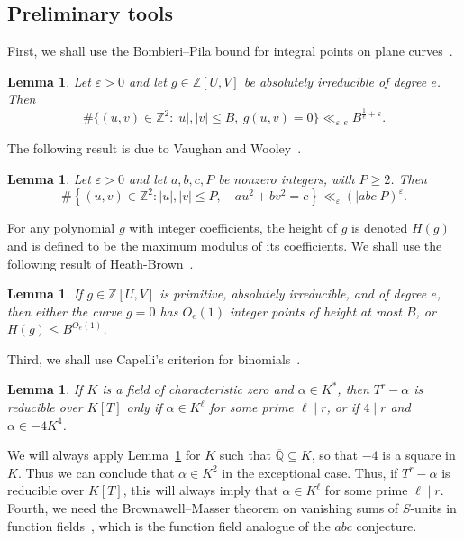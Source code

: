 \documentclass[a4paper,11pt,twoside,reqno]{amsart}
\newtheorem{lemma}[theorem]{Lemma}
\theoremstyle{definition}
\theoremstyle{remark}
\numberwithin{equation}{section}
\newcommand\eps{\varepsilon}
\newcommand\ve{\varepsilon}
\newcommand\Z{\mathbb{Z}}
\newcommand\ZZ{\mathbb{Z}}
\newcommand\K{\overline{\mathbb{Q}}}
\newcommand\1{\mathbf{1}}
\renewcommand{\leq}{\leqslant}
\renewcommand{\geq}{\geqslant}
\begin{document}
\subsection{Preliminary tools}\label{s:goat}

First, we shall use the Bombieri--Pila bound for integral points on plane curves~\cite[Theorem 5]{BombieriPila}.
\begin{lemma}\label{lem:BP}
Let $\ve>0$ and let $g\in\Z[U,V]$ be absolutely irreducible of degree $e$. Then 
\[
\#\{(u,v)\in\Z^2: |u|,|v|\leq B,\ g(u,v)=0\}\ll_{\eps,e}B^{\frac 1e+\eps}.
\] 
\end{lemma}

The following result is due to Vaughan and Wooley~\cite[Lemma~3.5]{VW}.

\begin{lemma}\label{lem:VW} 
Let $\ve>0$ and let $a,b,c,P$ be nonzero integers, with $P\geq2$. Then
 \[ \#\left\{ (u,v)\in\ZZ^2: |u|,|v|\leq P,\quad au^2+bv^2=c \right\} \ll_\varepsilon (|abc|P)^\varepsilon. \] 
 \end{lemma} 

For any polynomial $g$ with integer coefficients, the height of $g$ is 
denoted $H(g)$ and is 
defined to be the maximum modulus of its coefficients.
We shall use the following result of Heath-Brown~\cite[Theorem 5]{HeathBrown}.

\begin{lemma}\label{lem:large}
If $g\in\Z[U,V]$ is primitive, absolutely irreducible, and of degree $e$, then either the curve $g=0$ has $O_e(1)$ integer points of height at most $B$, or $H(g)\leq B^{O_e(1)}$. 
\end{lemma}

Third, we shall use Capelli's criterion for binomials~\cite[Theorem VI.9.1]{lang}. 
\begin{lemma}\label{lem:capelli}
If $K$ is a field of characteristic zero and $\alpha\in K^*$, then $T^r-\alpha$ is reducible over $K[T]$ only if $\alpha\in K^\ell$ for some prime $\ell\mid r$, or if $4\mid r$ and $\alpha\in -4K^4$.
\end{lemma}

We will always apply Lemma~\ref{lem:capelli} for $K$ such that $\K\subseteq K$, so that $-4$ is 
a square in $K$. Thus we can conclude that $\alpha\in K^2$ in the exceptional case. 
 Thus, if $T^r-\alpha$ is reducible over $K[T]$, this will always imply that $\alpha\in K^\ell$ for some prime $\ell\mid r$. Fourth, we need the Brownawell--Masser theorem on vanishing sums of $S$-units in function fields~\cite[Corollary~1]{BrownawellMasser}, which is the function field analogue of the $abc$ conjecture.
\end{document}

